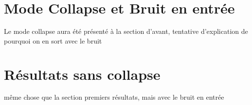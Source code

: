 \section{Mode Collapse et Bruit en entrée}

{Le mode collapse aura été présenté à la section d'avant, tentative d'explication de pourquoi on en sort avec le bruit}

\section{Résultats sans collapse}
{même chose que la section premiers résultats, mais avec le bruit en entrée}

